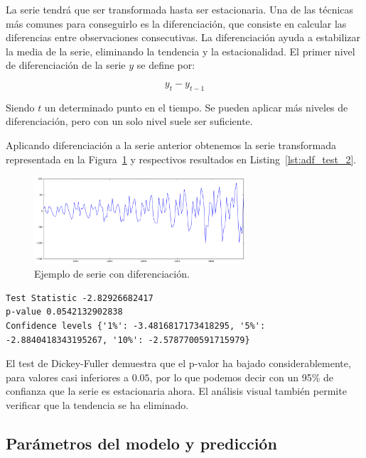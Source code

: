 \documentclass[11pt,spanish,listoffigures,listoftables]{tfgetsinf}
\begin{document}
    La serie tendrá que ser transformada hasta ser estacionaria. Una de las técnicas más comunes para conseguirlo es la diferenciación, que consiste en calcular las diferencias entre observaciones consecutivas. La diferenciación ayuda a estabilizar la media de la serie, eliminando la tendencia y la estacionalidad. El primer nivel de diferenciación de la serie \(y\) se define por:
    
    \begin{equation}
    y_{t}-y_{t-1}
    \end{equation}
    
    Siendo \(t\) un determinado punto en el tiempo. Se pueden aplicar más niveles de diferenciación, pero con un solo nivel suele ser suficiente.
    
    Aplicando diferenciación a la serie anterior obtenemos la serie transformada representada en la Figura~\ref{fig:ts_diff} y respectivos resultados en Listing~\ref{lst:adf_test_2}.
    
    \begin{figure}[h]
        \centering
        \includegraphics[width=0.7\textwidth]{ts_diff.png}
        \caption{Ejemplo de serie con diferenciación.}
        \label{fig:ts_diff}
    \end{figure}
    
    \begin{lstlisting}[caption=Resultados del test de Dickey-Fuller de {\tt statsmodels} de Python., label={lst:adf_test_2}]
Test Statistic -2.82926682417
p-value 0.0542132902838
Confidence levels {'1%': -3.4816817173418295, '5%': -2.8840418343195267, '10%': -2.5787700591715979}
    \end{lstlisting}
    
    El test de Dickey-Fuller demuestra que el p-valor ha bajado considerablemente, para valores casi inferiores a \(0.05\), por lo que podemos decir con un 95\% de confianza que la serie es estacionaria ahora. El análisis visual también permite verificar que la tendencia se ha eliminado.
    
    \subsection{Parámetros del modelo y predicción}
    
\end{document}
